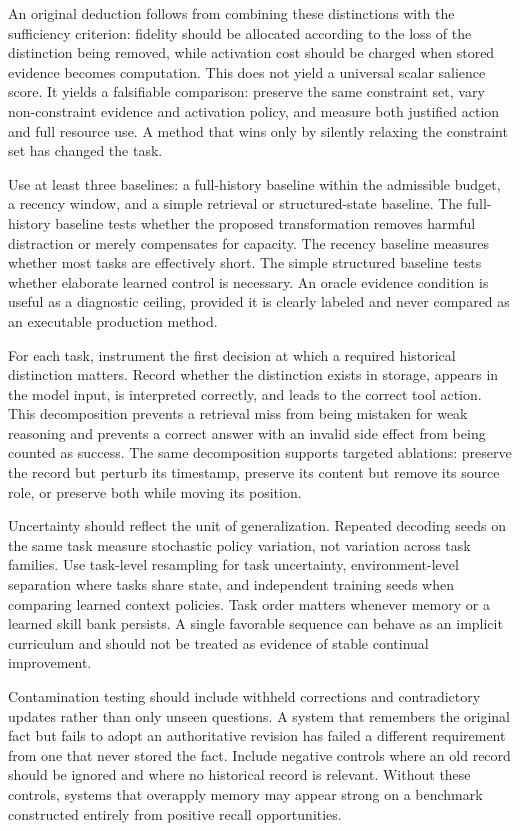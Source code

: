 An original deduction follows from combining these distinctions with the sufficiency criterion: fidelity should be allocated according to the loss of the distinction being removed, while activation cost should be charged when stored evidence becomes computation. This does not yield a universal scalar salience score. It yields a falsifiable comparison: preserve the same constraint set, vary non-constraint evidence and activation policy, and measure both justified action and full resource use. A method that wins only by silently relaxing the constraint set has changed the task.

Use at least three baselines: a full-history baseline within the admissible budget, a recency window, and a simple retrieval or structured-state baseline. The full-history baseline tests whether the proposed transformation removes harmful distraction or merely compensates for capacity. The recency baseline measures whether most tasks are effectively short. The simple structured baseline tests whether elaborate learned control is necessary. An oracle evidence condition is useful as a diagnostic ceiling, provided it is clearly labeled and never compared as an executable production method.

For each task, instrument the first decision at which a required historical distinction matters. Record whether the distinction exists in storage, appears in the model input, is interpreted correctly, and leads to the correct tool action. This decomposition prevents a retrieval miss from being mistaken for weak reasoning and prevents a correct answer with an invalid side effect from being counted as success. The same decomposition supports targeted ablations: preserve the record but perturb its timestamp, preserve its content but remove its source role, or preserve both while moving its position.

Uncertainty should reflect the unit of generalization. Repeated decoding seeds on the same task measure stochastic policy variation, not variation across task families. Use task-level resampling for task uncertainty, environment-level separation where tasks share state, and independent training seeds when comparing learned context policies. Task order matters whenever memory or a learned skill bank persists. A single favorable sequence can behave as an implicit curriculum and should not be treated as evidence of stable continual improvement.

Contamination testing should include withheld corrections and contradictory updates rather than only unseen questions. A system that remembers the original fact but fails to adopt an authoritative revision has failed a different requirement from one that never stored the fact. Include negative controls where an old record should be ignored and where no historical record is relevant. Without these controls, systems that overapply memory may appear strong on a benchmark constructed entirely from positive recall opportunities.

